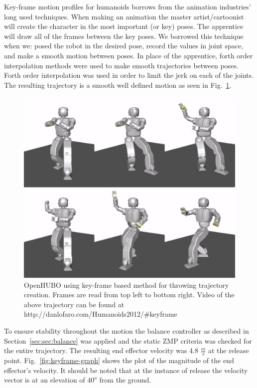

Key-frame motion profiles for humanoids borrows from the animation industries' long used techniques.  
When making an animation the master artist/cartoonist will create the character in the most important (or key) poses.  
The apprentice will draw all of the frames between the key poses.  
We borrowed this technique when we: posed the robot in the desired pose, record the values in joint space, and make a smooth motion between poses.  
In place of the apprentice, forth order interpolation methods were used to make smooth trajectories between poses.  
Forth order interpolation was used in order to limit the jerk on each of the joints.  
The resulting trajectory is a smooth well defined motion as seen in Fig.~\ref{fig:keyframe-throw}.

\begin{figure}[t]
  \centering
\includegraphics[width=0.8\columnwidth]{./pix/keyframe/keyframe.png}
  \caption{OpenHUBO using key-frame based method for throwing trajectory creation.  Frames are read from top left to bottom right.  Video of the above trajectory can be found at http://danlofaro.com/Humanoids2012/\#keyframe}
  \label{fig:keyframe-throw}
\end{figure}

To ensure stability throughout the motion the balance controller as described in Section~\ref{sec:sec:balance} was applied and the static ZMP criteria was checked for the entire trajectory.
The resulting end effector velocity was 4.8 $\frac{m}{s}$ at the release point.  
Fig.~\ref{fig:keyframe-graph} shows the plot of the magnitude of the end effector's velocity.  
It should be noted that at the instance of release the velocity vector is at an elevation of $40^o$ from the ground.

